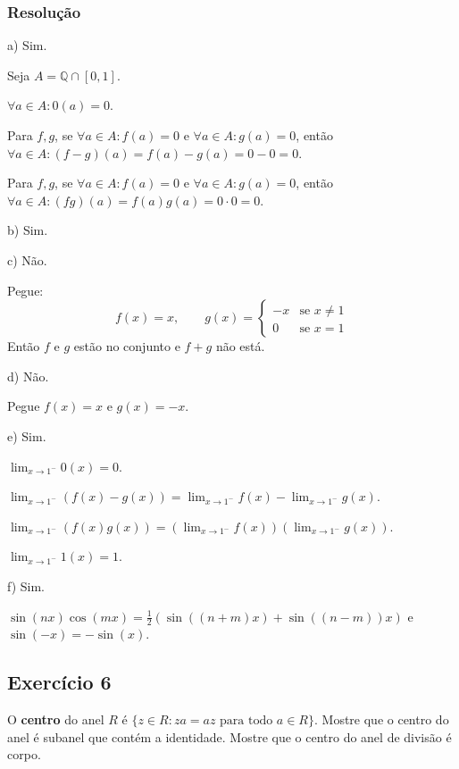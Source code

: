 \documentclass[10pt,a4paper]{article}
\begin{document}
\subsubsection*{Resolução}

a) Sim.

\medskip
\noindent
Seja $A=\mathbb{Q}\cap[0,1]$.

\medskip
\noindent
$\forall a\in A:0(a)=0$.

\medskip
\noindent
Para $f,g$, se $\forall a\in A:f(a)=0$ e $\forall a\in A:g(a)=0$, então $\forall a\in A:(f-g)(a)=f(a)-g(a)=0-0=0$.

\medskip
\noindent
Para $f,g$, se $\forall a\in A:f(a)=0$ e $\forall a\in A:g(a)=0$, então $\forall a\in A:(fg)(a)=f(a)g(a)=0\cdot 0=0$.

\medskip
\noindent
b) Sim.

\medskip
\noindent
c) Não.

\medskip
\noindent
Pegue:
\[
f(x)=x,\quad\quad g(x)=\left\{\begin{array}{cl}-x&\text{se }x\neq 1\\0&\text{se }x=1\end{array}\right.
\]
Então $f$ e $g$ estão no conjunto e $f+g$ não está.

\medskip
\noindent
d) Não.

\medskip
\noindent
Pegue $f(x)=x$ e $g(x)=-x$.

\medskip
\noindent
e) Sim.

\medskip
\noindent
$\lim_{x\to 1^-}0(x)=0$.

\medskip
\noindent
$\lim_{x\to 1^-}(f(x)-g(x))=\lim_{x\to 1^-}f(x)-\lim_{x\to 1^-}g(x)$.

\medskip
\noindent
$\lim_{x\to 1^-}(f(x)g(x))=(\lim_{x\to 1^-}f(x))(\lim_{x\to 1^-}g(x))$.

\medskip
\noindent
$\lim_{x\to 1^-}1(x)=1$.

\medskip
\noindent
f) Sim.

\medskip
\noindent
$\sin(nx)\cos(mx)=\frac{1}{2}(\sin((n+m)x)+\sin((n-m))x)$ e $\sin(-x)=-\sin(x)$.

\subsection*{Exercício 6}

O \textbf{centro} do anel $R$ é $\{z\in R:za=az\text{ para todo }a\in R\}$. Mostre que o centro do anel é subanel que contém a identidade. Mostre que o centro do anel de divisão é corpo.
\end{document}
